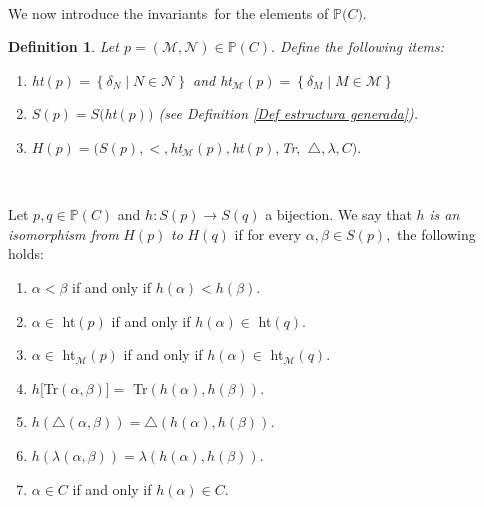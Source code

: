 \documentclass{article}
\newtheorem{definition}[theorem]{Definition}
\begin{document}
\qquad\ \qquad\ 

We now introduce the invariants\ for the elements of $\mathbb{P(}C\mathbb{)}$.

\begin{definition}
Let $p=(\mathcal{M},\mathcal{N})\in\mathbb{P}\left(  C\right)  .$ Define the
following items:

\begin{enumerate}
\item \textsf{ht}$\left(  p\right)  =\left\{  \delta_{N}\mid N\in
\mathcal{N}\right\}  $ and \textsf{ht}$_{\mathcal{M}}\left(  p\right)
=\left\{  \delta_{M}\mid M\in\mathcal{M}\right\}  $

\item $S\left(  p\right)  =S($\textsf{ht}$\left(  p\right)  )$ (see Definition
\ref{Def estructura generada}).

\item $H\left(  p\right)  =(S\left(  p\right)  ,<,$\textsf{ht}$_{\mathcal{M}%
}(p),$\textsf{ht}$(p),$\textsf{Tr}$\mathsf{,}$\textsf{\thinspace}%
$\triangle,\lambda,C).$
\end{enumerate}
\end{definition}

\qquad\ \qquad\ \ \ 

Let $p,q\in\mathbb{P}\left(  C\right)  $ and $h:S\left(  p\right)
\longrightarrow S\left(  q\right)  $ a bijection. We say that $h$ \emph{is an
isomorphism from }$H\left(  p\right)  $\emph{ to} $H\left(  q\right)  $ if for
every $\alpha,\beta\in S\left(  p\right)  ,$ the following holds:

\begin{enumerate}
\item $\alpha<\beta$ if and only if $h\left(  \alpha\right)  <h\left(
\beta\right)  .$

\item $\alpha\in$ \textsf{ht}$\left(  p\right)  $ if and only if $h\left(
\alpha\right)  \in$ \textsf{ht}$\left(  q\right)  .$

\item $\alpha\in$ \textsf{ht}$_{\mathcal{M}}\left(  p\right)  $ if and only if
$h\left(  \alpha\right)  \in$ \textsf{ht}$_{\mathcal{M}}\left(  q\right)  .$

\item $h[$\textsf{Tr}$(\alpha,\beta)]=$ \textsf{Tr}$(h\left(  \alpha\right)
,h\left(  \beta\right)  ).$

\item $h\left(  \triangle\left(  \alpha,\beta\right)  \right)  =\triangle
\left(  h\left(  \alpha\right)  ,h\left(  \beta\right)  \right)  .$

\item $h\left(  \lambda\left(  \alpha,\beta\right)  \right)  =\lambda\left(
h\left(  \alpha\right)  ,h\left(  \beta\right)  \right)  .$

\item $\alpha\in C$ if and only if $h\left(  \alpha\right)  \in C.$
\end{enumerate}
\end{document}
